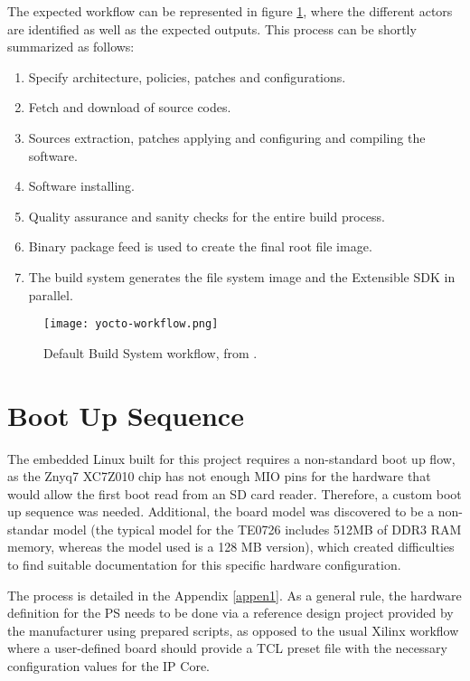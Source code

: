 The expected workflow can be represented in figure \ref{fig:yocto-workflow}, where the different
actors are identified as well as the expected outputs. This process can be shortly summarized as
follows:

\begin{enumerate}
	\item Specify architecture, policies, patches and configurations.
	\item Fetch and download of source codes.
	\item Sources extraction, patches applying and configuring and compiling the software.
	\item Software installing.
	\item Quality assurance and sanity checks for the entire build process.
	\item Binary package feed is used to create the final root file image.
	\item The build system generates the file system image and the Extensible SDK in parallel.
\end{enumerate}

\begin{figure}[htp]
	\centering
	\texttt{[image: yocto-workflow.png]}
	\caption{Default Build System workflow, from \cite{yocto-manual}.} \label{fig:yocto-workflow}
\end{figure}

\section{Boot Up Sequence}

The embedded Linux built for this project requires a non-standard boot up flow, as the Znyq7 XC7Z010
chip has not enough MIO pins for the hardware that would allow the first boot read from an SD card
reader. Therefore, a custom boot up sequence was needed. Additional, the board model was discovered
to be a non-standar model (the typical model for the TE0726 includes 512MB of DDR3 RAM memory,
whereas the model used is a 128 MB version), which created difficulties to find suitable
documentation for this specific hardware configuration.

The process is detailed in the Appendix \ref{appen1}. As a general rule, the hardware definition for
the PS needs to be done via a reference design project provided by the manufacturer using prepared
scripts, as opposed to the usual Xilinx workflow where a user-defined board should provide a TCL
preset file with the necessary configuration values for the IP Core.

